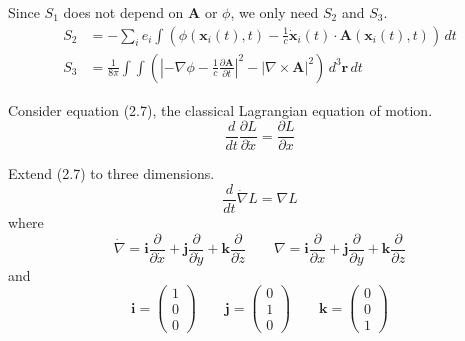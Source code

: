 


\bigskip
Since $S_1$ does not depend on $\mathbf A$ or $\phi$,
we only need $S_2$ and $S_3$.
\begin{align*}
S_2&=-\sum_i e_i\int\left(
\phi(\mathbf x_i(t),t)
-\frac{1}{c}\dot{\mathbf x}_i(t)\cdot\mathbf A(\mathbf x_i(t),t)
\right)
\,dt
\tag{9.25}
\\
S_3&=\frac{1}{8\pi}\int\int
\left(
\left|-\nabla\phi-\frac{1}{c}\frac{\partial\mathbf A}{\partial t}\right|^2
-\left|\nabla\times\mathbf A\right|^2
\right)
\,d^3\mathbf r\,dt
\tag{9.26}
\end{align*}

Consider equation (2.7), the classical Lagrangian equation of motion.
\begin{equation*}
\frac{d}{dt}\frac{\partial L}{\partial\dot x}=\frac{\partial L}{\partial x}
\tag{2.7}
\end{equation*}

Extend (2.7) to three dimensions.
\begin{equation*}
\frac{d}{dt}\dot\nabla L=\nabla L
\tag{1}
\end{equation*}
where
\begin{equation*}
\dot\nabla
=\mathbf i\frac{\partial}{\partial\dot x}
+\mathbf j\frac{\partial}{\partial\dot y}
+\mathbf k\frac{\partial}{\partial\dot z}
\qquad
\nabla
=\mathbf i\frac{\partial}{\partial x}
+\mathbf j\frac{\partial}{\partial y}
+\mathbf k\frac{\partial}{\partial z}
\end{equation*}
and
\begin{equation*}
\mathbf i=\begin{pmatrix}1\\0\\0\end{pmatrix}
\qquad
\mathbf j=\begin{pmatrix}0\\1\\0\end{pmatrix}
\qquad
\mathbf k=\begin{pmatrix}0\\0\\1\end{pmatrix}
\end{equation*}

